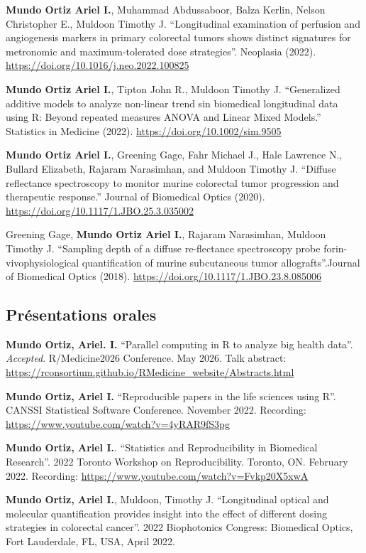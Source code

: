 \documentclass[10pt,]{article}
\begin{document}
\textbf{Mundo Ortiz Ariel I.}, Muhammad Abdussaboor, Balza Kerlin,
Nelson Christopher E., Muldoon Timothy J. ``Longitudinal examination of
perfusion and angiogenesis markers in primary colorectal tumors shows
distinct signatures for metronomic and maximum-tolerated dose
strategies''. Neoplasia (2022).
\url{https://doi.org/10.1016/j.neo.2022.100825}

\textbf{Mundo Ortiz Ariel I.}, Tipton John R., Muldoon Timothy J.
``Generalized additive models to analyze non-linear trend sin biomedical
longitudinal data using R: Beyond repeated measures ANOVA and Linear
Mixed Models.'' Statistics in Medicine (2022).
\url{https://doi.org/10.1002/sim.9505}

\textbf{Mundo Ortiz Ariel I.}, Greening Gage, Fahr Michael J., Hale
Lawrence N., Bullard Elizabeth, Rajaram Narasimhan, and Muldoon Timothy
J. ``Diffuse reflectance spectroscopy to monitor murine colorectal tumor
progression and therapeutic response.'' Journal of Biomedical Optics
(2020). \url{https://doi.org/10.1117/1.JBO.25.3.035002}

Greening Gage, \textbf{Mundo Ortiz Ariel I.}, Rajaram Narasimhan,
Muldoon Timothy J. ``Sampling depth of a diffuse re-flectance
spectroscopy probe forin-vivophysiological quantification of murine
subcutaneous tumor allografts''.Journal of Biomedical Optics (2018).
\url{https://doi.org/10.1117/1.JBO.23.8.085006}

\subsection{Présentations orales}\label{pruxe9sentations-orales}

\textbf{Mundo Ortiz, Ariel. I.} ``Parallel computing in R to analyze big
health data''. \emph{Accepted}. R/Medicine2026 Conference. May 2026.
Talk abstract:
\url{https://rconsortium.github.io/RMedicine_website/Abstracts.html}

\textbf{Mundo Ortiz, Ariel I.} ``Reproducible papers in the life
sciences using R''. CANSSI Statistical Software Conference. November
2022. Recording: \url{https://www.youtube.com/watch?v=4yRAR9fS3pg}

\textbf{Mundo Ortiz, Ariel I.}. ``Statistics and Reproducibility in
Biomedical Research''. 2022 Toronto Workshop on Reproducibility.
Toronto, ON. February 2022. Recording:
\url{https://www.youtube.com/watch?v=Fvkp20X5xwA}

\textbf{Mundo Ortiz, Ariel I.}, Muldoon, Timothy J. ``Longitudinal
optical and molecular quantification provides insight into the effect of
different dosing strategies in colorectal cancer''. 2022 Biophotonics
Congress: Biomedical Optics, Fort Lauderdale, FL, USA, April 2022.
\end{document}
